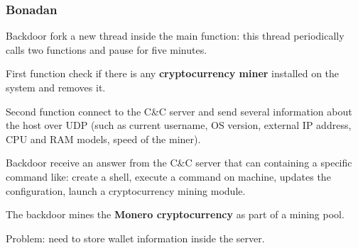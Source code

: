 \begin{frame}
	\frametitle{Bonadan}
	
	Backdoor fork a new thread inside the main function: this thread periodically calls two functions and pause for five minutes.
	
	\bigskip
	
	First function check if there is any \textbf{cryptocurrency miner} installed on the system and removes it.
	
	\bigskip
	
  Second function connect to the C\&C server and send several information about the host over UDP (such as current username, OS version, external IP address, CPU and RAM models, speed of the miner).
  
	\bigskip
	
	Backdoor receive an answer from the C\&C server that can containing a specific command like: create a shell, execute a command on machine, updates the configuration, launch a cryptocurrency mining module.
	
	\bigskip
	
  The backdoor mines the \textbf{Monero cryptocurrency} as part of a mining pool.

	\bigskip
	
  Problem: need to store wallet information inside the server.
  
\end{frame}
	


